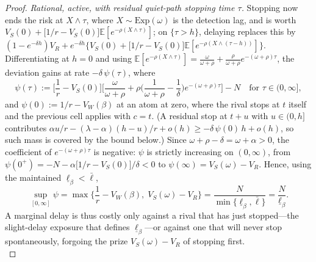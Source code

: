 \documentclass[12pt,reqno]{article}
\newcommand{\Ex}{\mathbb{E}}
\theoremstyle{definition} \newtheorem{example}{Example}
\theoremstyle{definition} \newtheorem{condition}{Condition}
\theoremstyle{definition} \newtheorem{corollary}{Corollary}
\theoremstyle{definition} \newtheorem{claim}{Claim}
\theoremstyle{definition} \newtheorem{definition}{Definition}
\theoremstyle{definition} \newtheorem{conjecture}{Conjecture}
\theoremstyle{definition} \newtheorem{Lemma}{Lemma}
\theoremstyle{definition} \newtheorem{lemma}{Lemma}
\theoremstyle{plain} \newtheorem{theorem}{Theorem}
\theoremstyle{definition} \newtheorem{assumption}{Assumption}
\theoremstyle{definition} \newtheorem*{assumptionnonumber}{Assumption}
\theoremstyle{definition} \newtheorem*{theoremNoNumber}{Proposition}
\theoremstyle{definition}
\theoremstyle{definition}\newtheorem{proposition}{Proposition}
\theoremstyle{definition} \newtheorem{result}{Result}
\theoremstyle{definition} \newtheorem*{definitionNoNumber}{Definition}
\theoremstyle{definition} \newtheorem{Definition}{Definition}
\theoremstyle{definition} \newtheorem*{DefinitionNoNumber}{Definition}
\theoremstyle{definition} \newtheorem*{fact}{Fact}
\theoremstyle{definition} \newtheorem*{property}{Property}
\theoremstyle{definition} \newtheorem{remark}{Remark}
\begin{document}
\begin{proof}
\noindent \emph{Rational, active, with residual quiet-path stopping time $\tau$.} Stopping now ends the risk at $X\wedge\tau$, where $X\sim\mathrm{Exp}(\omega)$ is the detection lag, and is worth $V_S(0)+\big[1/r-V_S(0)\big]\Ex[e^{-\rho(X\wedge\tau)}]$; on $\{\tau>h\}$, delaying replaces this by $(1-e^{-\delta h})V_R+e^{-\delta h}\big\{V_S(0)+\big[1/r-V_S(0)\big]\Ex[e^{-\rho(X\wedge(\tau-h))}]\big\}$. Differentiating at $h=0$ and using $\Ex[e^{-\rho(X\wedge\tau)}]=\tfrac{\omega}{\omega+\rho}+\tfrac{\rho}{\omega+\rho}e^{-(\omega+\rho)\tau}$, the deviation gains at rate $-\delta\,\psi(\tau)$, where
\[
\psi(\tau):=\Big[\frac1r-V_S(0)\Big]\Big[\frac{\omega}{\omega+\rho}+\rho\Big(\frac{1}{\omega+\rho}-\frac1\delta\Big)e^{-(\omega+\rho)\tau}\Big]-N
\quad\text{for }\tau\in(0,\infty],
\]
and $\psi(0):=1/r-V_W(\beta)$ at an atom at zero, where the rival stops at $t$ itself and the previous cell applies with $c=t$. (A residual stop at $t+u$ with $u\in(0,h]$ contributes $\alpha u/r-(\lambda-\alpha)(h-u)/r+o(h)\ge-\delta\,\psi(0)\,h+o(h)$, so such mass is covered by the bound below.) Since $\omega+\rho-\delta=\omega+\alpha>0$, the coefficient of $e^{-(\omega+\rho)\tau}$ is negative: $\psi$ is strictly increasing on $(0,\infty)$, from $\psi(0^+)=-N-\alpha\big[1/r-V_S(0)\big]/\delta<0$ to $\psi(\infty)=V_S(\omega)-V_R$. Hence, using the maintained $\underline\ell_\beta<\bar\ell$,
\[
\sup_{[0,\infty]}\psi=\max\Big\{\frac1r-V_W(\beta),\;V_S(\omega)-V_R\Big\}=\frac{N}{\min\{\underline\ell_\beta,\bar\ell\}}=\frac{N}{\underline\ell_\beta}.
\]
A marginal delay is thus costly only against a rival that has just stopped---the slight-delay exposure that defines $\underline\ell_\beta$---or against one that will never stop spontaneously, forgoing the prize $V_S(\omega)-V_R$ of stopping first. \\ 


\end{proof}
\end{document}
